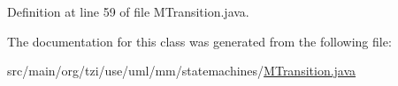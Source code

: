 Definition at line 59 of file M\-Transition.\-java.



The documentation for this class was generated from the following file\-:\begin{DoxyCompactItemize}
\item 
src/main/org/tzi/use/uml/mm/statemachines/\hyperlink{_m_transition_8java}{M\-Transition.\-java}\end{DoxyCompactItemize}
